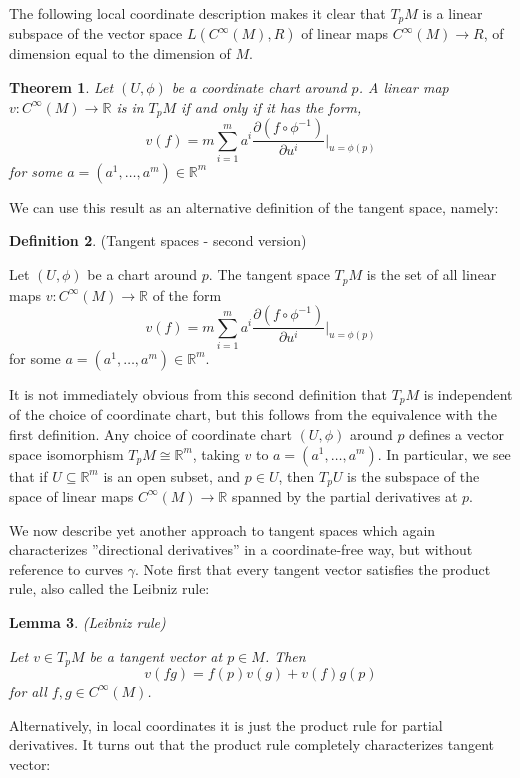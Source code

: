 \documentclass{article}
\newtheorem{theorem}{Theorem}[section]
\newtheorem{lemma}[theorem]{Lemma}
\theoremstyle{definition}
\newtheorem{defn}[theorem]{Definition}
\newenvironment{definition}
  {\vspace{8pt}\begin{mdframed}[backgroundcolor=blueish,innertopmargin=4]\begin{defn}}
  {\end{defn}\end{mdframed}\vspace{4pt}}
\begin{document}
The following local coordinate description makes it clear that $T_pM$ is a linear subspace of the vector space $L(C^\infty(M),R)$ of linear maps $C^\infty(M) \rightarrow R$, of dimension equal to the dimension of $M$.

\begin{theorem}
Let $(U,\phi)$ be a coordinate chart around $p$. A linear map $v : C^\infty(M) \rightarrow \mathbb R$ is in $T_pM$ if and only if it has the form, 
\[
    v(f) = m \sum_{i=1}^m a^i \frac{\partial (f \circ \phi^{-1} )}{ \partial u^i}\Bigr|_{u = \phi(p)}
\]
for some $a = (a^1 ,\dots,a^m) \in \mathbb R^m$
\end{theorem}

We can use this result as an alternative definition of the tangent space, namely:

\begin{definition} (Tangent spaces - second version)


Let $(U,\phi)$ be a chart around $p$. The tangent space $T_pM$ is the set of all linear maps $v : C^\infty(M) \rightarrow \mathbb R$ of the form 
\[
     v(f) = m \sum_{i=1}^m a^i \frac{\partial (f \circ \phi^{-1} )}{ \partial u^i}\Bigr|_{u = \phi(p)} 
\]
for some $a = (a^1 ,\dots,a^m) \in \mathbb R^m$.
\end{definition}

It is not immediately obvious from this second definition that $T_pM$ is independent of the choice of coordinate chart, but this follows from the equivalence with the first definition. Any choice of coordinate chart $(U,\phi)$ around $p$ defines a vector space isomorphism $T_pM \cong \mathbb R^m$, taking $v$ to $a = (a^1 ,\dots,a^m)$. In particular, we see that if $U \subseteq \mathbb R^m$ is an open subset, and $p \in U$, then $T_pU$ is the subspace of the space of linear maps $C^\infty(M) \rightarrow \mathbb R$ spanned by the partial derivatives at $p$.

We now describe yet another approach to tangent spaces which again characterizes ''directional derivatives'' in a coordinate-free way, but without reference to curves $\gamma$. Note first that every tangent vector satisfies the product rule, also called the Leibniz rule:
\begin{lemma} (Leibniz rule)

Let $v \in T_pM$ be a tangent vector at $p \in M$. Then 
\[ 
    v(f g) = f(p) v(g) +v(f)g(p) 
\]
for all $f,g \in C ^\infty(M)$.
\end{lemma}
Alternatively, in local coordinates it is just the product rule for partial derivatives. It turns out that the product rule completely characterizes tangent vector:
\end{document}
